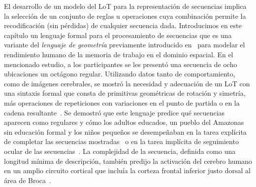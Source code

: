 
El desarrollo de un modelo del LoT para la representación de secuencias implica la selección de un conjunto de reglas u operaciones cuya combinación permite la recodificación (sin pérdidas) de cualquier secuencia dada. Introducimos en este capítulo un lenguaje formal para el procesamiento de secuencias que es una variante del \textit{lenguaje de geometría} previamente introducido en~\cite{amalric2017language} para modelar el rendimiento humano de la memoria de trabajo en el dominio espacial. En el mencionado estudio, a los participantes se les presentó una secuencia de ocho ubicaciones un octágono regular. Utilizando datos tanto de comportamiento, como de imágenes cerebrales, se mostró la necesidad y adecuación de un LoT con una sintaxis formal que consta de primitivas geométricas de rotación y simetría, más operaciones de repeticiones con variaciones en el punto de partida o en la cadena resultante~\cite{romano2018bayesian,amalric2017language,f59,f60}. Se demostró que este lenguaje predice qué secuencias aparecen como regulares y cómo los adultos educados, un pueblo del Amazonas sin educación formal y los niños pequeños se desempeñaban en la tarea explícita de completar las secuencias mostradas~\cite{amalric2017language} o en la tarea implícita de seguimiento ocular de las secuencias~\cite{f60}. La complejidad de la secuencia, definida como una longitud mínima de descripción, también predijo la activación del cerebro humano en un amplio circuito cortical que incluía la corteza frontal inferior justo dorsal al área de Broca~\cite{f60}.

